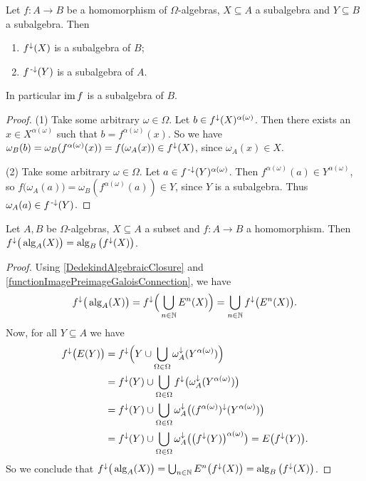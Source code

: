\begin{proposition} \label{imageSubalgebra}
Let $f:A\to B$ be a homomorphism of $\Omega$-algebras, $X\subseteq A$ a subalgebra and $Y\subseteq B$ a subalgebra. Then
\begin{enumerate}
\item $f^{\downarrow}(X)$ is a subalgebra of $B$;
\item $f^{\text{\hspace{0.15em}-}\downarrow}(Y)$ is a subalgebra of $A$.
\end{enumerate}
\end{proposition}
In particular $\operatorname{im} f$ is a subalgebra of $B$.
\begin{proof}
(1) Take some arbitrary $\omega\in\Omega$. Let $b\in f^{\downarrow}(X)^{\alpha(\omega)}$. Then there exists an $x\in X^{\alpha(\omega)}$ such that $b = f^{\alpha(\omega)}(x)$. So we have $\omega_B(b) = \omega_B(f^{\alpha(\omega)}(x)) = f(\omega_A(x)) \in f^\downarrow(X)$, since $\omega_A(x) \in X$.

(2) Take some arbitrary $\omega\in\Omega$. Let $a\in f^{{\text{\hspace{0.15em}-}\downarrow}}(Y)^{\alpha(\omega)}$. Then $f^{\alpha(\omega)}(a) \in Y^{\alpha(\omega)}$, so $f\big(\omega_A(a)\big) = \omega_B(f^{\alpha(\omega)}(a)) \in Y$, since $Y$ is a subalgebra. Thus $\omega_A(a)\in f^{\text{\hspace{0.15em}-}\downarrow}(Y)$.
\end{proof}

\begin{proposition}
Let $A,B$ be $\Omega$-algebras, $X\subseteq A$ a subset and $f: A\to B$ a homomorphism. Then $f^\downarrow\big(\operatorname{alg}_A(X)\big) = \operatorname{alg}_B\big(f^\downarrow(X)\big)$.
\end{proposition}
\begin{proof}
Using \ref{DedekindAlgebraicClosure} and \ref{functionImagePreimageGaloisConnection}, we have
\[ f^\downarrow\big(\operatorname{alg}_A(X)\big) = f^\downarrow\Big(\bigcup_{n\in\mathbb{N}} E^n(X)\Big) = \bigcup_{n\in\mathbb{N}}f^\downarrow\big( E^n(X)\big). \]
Now, for all $Y\subseteq A$ we have
\begin{align*}
f^\downarrow\big(E(Y)\big) &= f^\downarrow\Big(Y \cup \bigcup_{\Omega\in\Omega}\omega_A^\downarrow(Y^{\alpha(\omega)})\Big) \\
&= f^\downarrow(Y) \cup \bigcup_{\Omega\in\Omega}f^\downarrow\big(\omega_A^\downarrow(Y^{\alpha(\omega)})\big) \\
&= f^\downarrow(Y) \cup \bigcup_{\Omega\in\Omega}\omega_A^\downarrow\big((f^{\alpha(\omega)})^\downarrow (Y^{\alpha(\omega)})\big) \\
&= f^\downarrow(Y) \cup \bigcup_{\Omega\in\Omega}\omega_A^\downarrow\big(\big(f^\downarrow(Y)\big)^{\alpha(\omega)}\big) = E\big(f^\downarrow(Y)\big).
\end{align*}
So we conclude that $f^\downarrow\big(\operatorname{alg}_A(X)\big) = \bigcup_{n\in\mathbb{N}}E^n\big( f^\downarrow(X)\big) = \operatorname{alg}_B\big(f^\downarrow(X)\big)$.
\end{proof}

